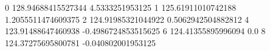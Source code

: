 0 128.94688415527344 4.5333251953125
1 125.61911010742188 1.2055511474609375
2 124.91985321044922 0.5062942504882812
4 123.91488647460938 -0.4986724853515625
6 124.41355895996094 0.0
8 124.37275695800781 -0.040802001953125
